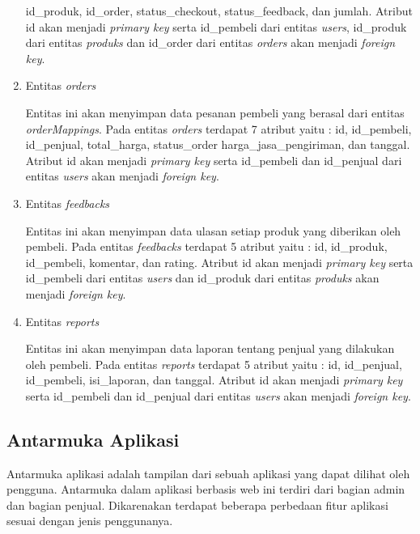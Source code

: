 \begin{enumerate}
	id\_produk, id\_order, status\_checkout, status\_feedback, dan jumlah. Atribut id
	akan menjadi \textit{primary key} serta id\_pembeli dari entitas \textit{users}, id\_produk dari entitas \textit{produks} dan id\_order dari entitas \textit{orders} akan menjadi \textit{foreign key}.
	\item Entitas \textit{orders}
	\par Entitas ini akan menyimpan data pesanan pembeli yang berasal dari entitas \textit{orderMappings}. Pada entitas \textit{orders} terdapat 7 atribut yaitu : id, id\_pembeli, id\_penjual, total\_harga, status\_order harga\_jasa\_pengiriman, dan tanggal. Atribut id akan menjadi \textit{primary key} serta id\_pembeli dan id\_penjual dari entitas \textit{users} akan menjadi \textit{foreign key}.
	\item Entitas \textit{feedbacks}
	\par Entitas ini akan menyimpan data ulasan setiap produk yang diberikan oleh pembeli. Pada entitas \textit{feedbacks} terdapat 5 atribut yaitu : id, id\_produk,
	id\_pembeli, komentar, dan rating. Atribut id akan menjadi \textit{primary key} serta id\_pembeli dari entitas \textit{users} dan id\_produk dari entitas \textit{produks} akan menjadi \textit{foreign key}.
	\item Entitas \textit{reports}
	\par Entitas ini akan menyimpan data laporan tentang penjual yang dilakukan oleh pembeli. Pada entitas \textit{reports} terdapat 5 atribut yaitu : id, id\_penjual, id\_pembeli, isi\_laporan, dan tanggal. Atribut id akan menjadi \textit{primary key} serta id\_pembeli dan id\_penjual dari entitas \textit{users} akan menjadi \textit{foreign key}.
\end{enumerate}
	
\subsection{Antarmuka Aplikasi}
Antarmuka aplikasi adalah tampilan dari sebuah aplikasi yang dapat dilihat oleh pengguna. Antarmuka dalam aplikasi berbasis web ini terdiri dari bagian admin dan bagian penjual. Dikarenakan terdapat beberapa perbedaan fitur aplikasi sesuai dengan jenis penggunanya.

